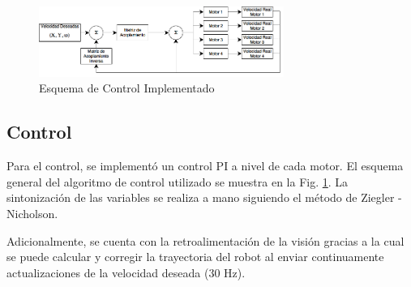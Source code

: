 \documentclass[twocolumn,10pt]{amrob}
\begin{document}

\begin{figure}
  \centering
    \includegraphics[width=8cm]{ciclo_ctrl_avr.png}
  \caption{Esquema de Control Implementado}
  \label{fig:ctrl}
\end{figure}
\subsection*{Control}
Para el control, se implementó un control PI a nivel de cada motor. El esquema general del algoritmo de control utilizado se muestra en la Fig. \ref{fig:ctrl}. La sintonización de las variables se realiza a mano siguiendo el método de Ziegler - Nicholson. \par
Adicionalmente, se cuenta con la retroalimentación de la visión gracias a la cual se puede calcular y corregir la trayectoria del robot al enviar continuamente actualizaciones de la velocidad deseada (30 Hz). 
\end{document}
